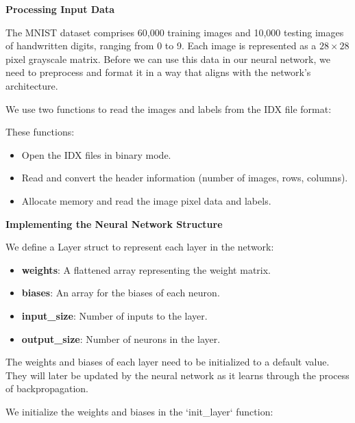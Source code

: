 \vspace{5mm}
{\noindent\huge\bf Processing Input Data}
\vspace{5mm}

The MNIST dataset comprises 60,000 training images and 10,000 testing images of
handwritten digits, ranging from 0 to 9. Each image is represented as a $28 \times 28$
pixel grayscale matrix. Before we can use this data in our neural network, we
need to preprocess and format it in a way that aligns with the network's
architecture.

We use two functions to read the images and labels from the IDX file format:

These functions:

\begin{itemize}
    \item Open the IDX files in binary mode.

    \item Read and convert the header information (number of images, rows, columns).

    \item Allocate memory and read the image pixel data and labels.
\end{itemize}

\vspace{5mm}
{\noindent\huge\bf Implementing the Neural Network Structure}
\vspace{5mm}

We define a Layer struct to represent each layer in the network:

\begin{itemize}
    \item {\bf weights}: A flattened array representing the weight matrix.

    \item {\bf biases}: An array for the biases of each neuron.

    \item {\bf input\_size}: Number of inputs to the layer.

    \item {\bf output\_size}: Number of neurons in the layer.
\end{itemize}

The weights and biases of each layer need to be initialized to a default value.
They will later be updated by the neural network as it learns through the
process of backpropagation.

We initialize the weights and biases in the `init\_layer` function:

